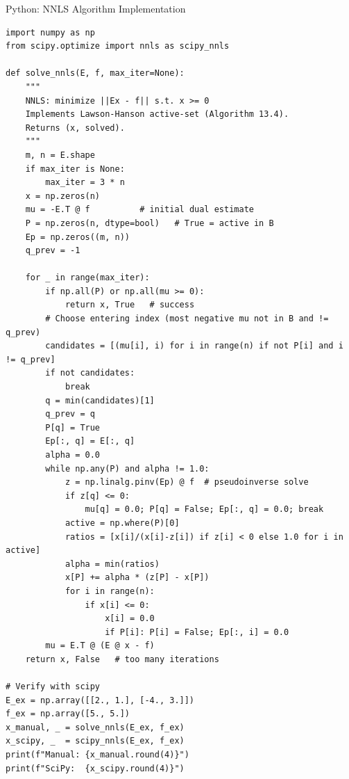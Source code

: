\documentclass[aspectratio=169,10pt]{beamer}
\begin{document}
\begin{frame}[fragile]{Python: NNLS Algorithm Implementation}
\begin{lstlisting}[caption={Algorithm 13.4 in Python (Lawson--Hanson active-set method)}]
import numpy as np
from scipy.optimize import nnls as scipy_nnls

def solve_nnls(E, f, max_iter=None):
    """
    NNLS: minimize ||Ex - f|| s.t. x >= 0
    Implements Lawson-Hanson active-set (Algorithm 13.4).
    Returns (x, solved).
    """
    m, n = E.shape
    if max_iter is None:
        max_iter = 3 * n
    x = np.zeros(n)
    mu = -E.T @ f          # initial dual estimate
    P = np.zeros(n, dtype=bool)   # True = active in B
    Ep = np.zeros((m, n))
    q_prev = -1

    for _ in range(max_iter):
        if np.all(P) or np.all(mu >= 0):
            return x, True   # success
        # Choose entering index (most negative mu not in B and != q_prev)
        candidates = [(mu[i], i) for i in range(n) if not P[i] and i != q_prev]
        if not candidates:
            break
        q = min(candidates)[1]
        q_prev = q
        P[q] = True
        Ep[:, q] = E[:, q]
        alpha = 0.0
        while np.any(P) and alpha != 1.0:
            z = np.linalg.pinv(Ep) @ f  # pseudoinverse solve
            if z[q] <= 0:
                mu[q] = 0.0; P[q] = False; Ep[:, q] = 0.0; break
            active = np.where(P)[0]
            ratios = [x[i]/(x[i]-z[i]) if z[i] < 0 else 1.0 for i in active]
            alpha = min(ratios)
            x[P] += alpha * (z[P] - x[P])
            for i in range(n):
                if x[i] <= 0:
                    x[i] = 0.0
                    if P[i]: P[i] = False; Ep[:, i] = 0.0
        mu = E.T @ (E @ x - f)
    return x, False   # too many iterations

# Verify with scipy
E_ex = np.array([[2., 1.], [-4., 3.]])
f_ex = np.array([5., 5.])
x_manual, _ = solve_nnls(E_ex, f_ex)
x_scipy, _  = scipy_nnls(E_ex, f_ex)
print(f"Manual: {x_manual.round(4)}")
print(f"SciPy:  {x_scipy.round(4)}")
\end{lstlisting}
\end{frame}
\end{document}
